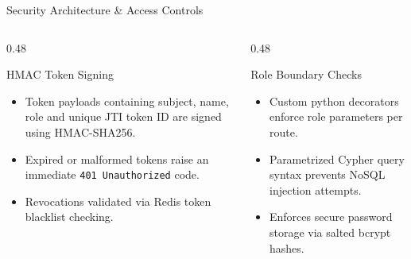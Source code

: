 \documentclass[aspectratio=169, 10pt]{beamer}
\begin{document}
\begin{frame}{Security Architecture \& Access Controls}
  \begin{columns}[T]
    \begin{column}{0.48\textwidth}
      \begin{scard}{HMAC Token Signing}
        \begin{itemize}
          \item Token payloads containing subject, name, role and unique JTI token ID are signed using HMAC-SHA256.
          \item Expired or malformed tokens raise an immediate \texttt{401 Unauthorized} code.
          \item Revocations validated via Redis token blacklist checking.
        \end{itemize}
      \end{scard}
    \end{column}
    \begin{column}{0.48\textwidth}
      \begin{scard}{Role Boundary Checks}
        \begin{itemize}
          \item Custom python decorators enforce role parameters per route.
          \item Parametrized Cypher query syntax prevents NoSQL injection attempts.
          \item Enforces secure password storage via salted bcrypt hashes.
        \end{itemize}
      \end{scard}
    \end{column}
  \end{columns}
\end{frame}
\end{document}
